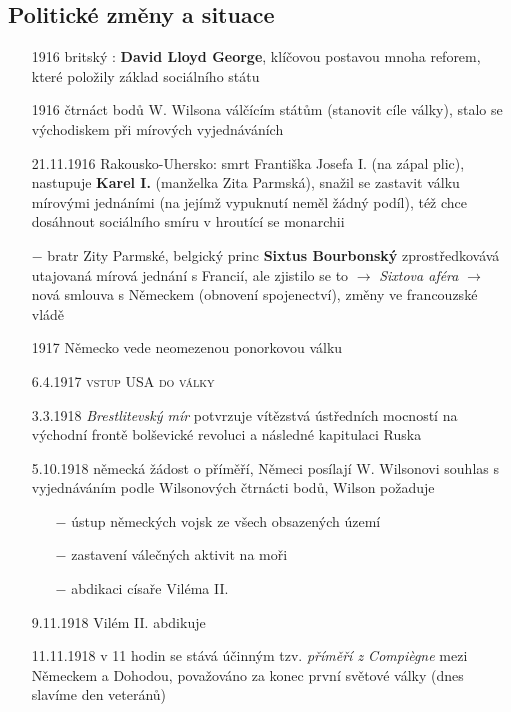 \documentclass{article}
\begin{document}
\subsection*{Politické změny a situace}
\begin{itemize}
    \vspace{-0.5em}
    \setlength\itemsep{0.15em}
    \item[1916] britský : \textbf{David Lloyd George}, klíčovou postavou mnoha reforem, které položily základ sociálního státu
    \item[1916] čtrnáct bodů W. Wilsona válčícím státům (stanovit cíle války), stalo se východiskem při mírových vyjednáváních
    \item[21.11.1916] Rakousko-Uhersko: smrt Františka Josefa I. (na zápal plic), nastupuje \textbf{Karel I.} (manželka Zita Parmská), snažil se zastavit válku mírovými jednáními (na jejímž vypuknutí neměl žádný podíl), též chce dosáhnout sociálního smíru v hroutící se monarchii
    \item[$-$]  bratr Zity Parmské, belgický princ \textbf{Sixtus Bourbonský} zprostředkovává utajovaná mírová jednání s Francií, ale zjistilo se to $\rightarrow$ \textit{Sixtova aféra} $\rightarrow$  nová smlouva s Německem (obnovení spojenectví), změny ve francouzské vládě
    \item[1917] Německo vede neomezenou ponorkovou válku
    \item[6.4.1917] \textsc{vstup USA do války}
    \item[3.3.1918] \textit{Brestlitevský mír} potvrzuje vítězstvá ústředních mocností na východní frontě bolševické revoluci a následné kapitulaci Ruska
    \item[5.10.1918] německá žádost o příměří, Němeci posílají W. Wilsonovi souhlas s vyjednáváním podle Wilsonových čtrnácti bodů, Wilson požaduje \begin{itemize}
        \vspace{-0.5em}
        \setlength\itemsep{0.15em}
        \item[$-$] ústup německých vojsk ze všech obsazených území
        \item[$-$] zastavení válečných aktivit na moři
        \item[$-$] abdikaci císaře Viléma II.
    \end{itemize}
    \item[9.11.1918]  Vilém II. abdikuje
    \item[11.11.1918] v 11 hodin se stává účinným tzv. \textit{příměří z Compiègne} mezi Německem a Dohodou, považováno za konec první světové války (dnes slavíme den veteránů)
\end{itemize}
\end{document}
